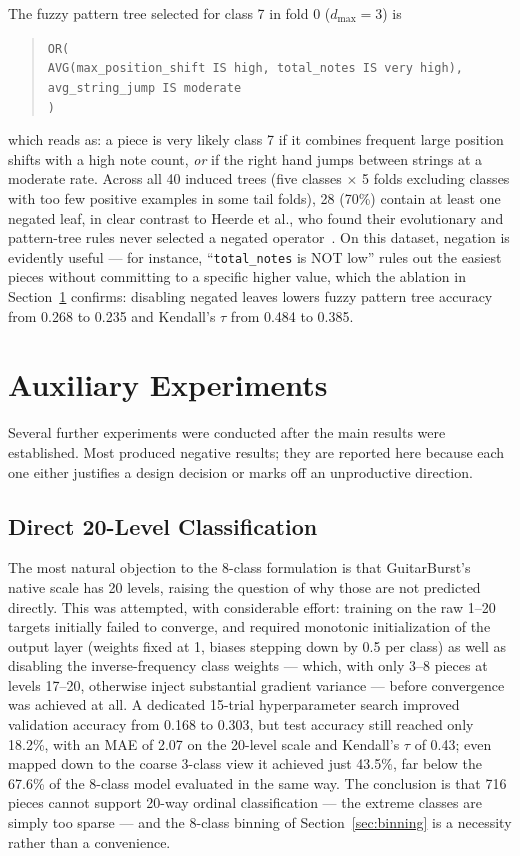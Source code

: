 The fuzzy pattern tree selected for class 7 in fold 0 ($d_{\max} = 3$) is
\begin{quote}
\texttt{OR(\\
\hphantom{xx}AVG(max\_position\_shift IS high, total\_notes IS very high),\\
\hphantom{xx}avg\_string\_jump IS moderate\\
)}
\end{quote}
which reads as: a piece is very likely class 7 if it combines frequent large position shifts with a high note count, \emph{or} if the right hand jumps between strings at a moderate rate. Across all 40 induced trees (five classes $\times$ 5 folds excluding classes with too few positive examples in some tail folds), 28 (70\%) contain at least one negated leaf, in clear contrast to Heerde et al., who found their evolutionary and pattern-tree rules never selected a negated operator~\cite{heerde2020comparing}. On this dataset, negation is evidently useful --- for instance, ``\texttt{total\_notes} is NOT low'' rules out the easiest pieces without committing to a specific higher value, which the ablation in Section~\ref{sec:auxiliary} confirms: disabling negated leaves lowers fuzzy pattern tree accuracy from 0.268 to 0.235 and Kendall's $\tau$ from 0.484 to 0.385.

\section{Auxiliary Experiments}
\label{sec:auxiliary}
Several further experiments were conducted after the main results were established. Most produced negative results; they are reported here because each one either justifies a design decision or marks off an unproductive direction.

\subsection{Direct 20-Level Classification}
\label{sec:raw20}
The most natural objection to the 8-class formulation is that GuitarBurst's native scale has 20 levels, raising the question of why those are not predicted directly. This was attempted, with considerable effort: training on the raw 1--20 targets initially failed to converge, and required monotonic initialization of the output layer (weights fixed at 1, biases stepping down by 0.5 per class) as well as disabling the inverse-frequency class weights --- which, with only 3--8 pieces at levels 17--20, otherwise inject substantial gradient variance --- before convergence was achieved at all. A dedicated 15-trial hyperparameter search improved validation accuracy from 0.168 to 0.303, but test accuracy still reached only 18.2\%, with an MAE of 2.07 on the 20-level scale and Kendall's $\tau$ of 0.43; even mapped down to the coarse 3-class view it achieved just 43.5\%, far below the 67.6\% of the 8-class model evaluated in the same way. The conclusion is that 716 pieces cannot support 20-way ordinal classification --- the extreme classes are simply too sparse --- and the 8-class binning of Section~\ref{sec:binning} is a necessity rather than a convenience.

